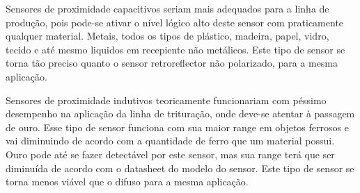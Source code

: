 \documentclass{article}
\begin{document}
Sensores de proximidade capacitivos seriam mais adequados para a linha de produção, pois pode-se ativar o nível lógico alto deste sensor com praticamente qualquer material. Metais, todos os tipos de plástico, madeira, papel, vidro, tecido e até mesmo liquidos em recepiente não metálicos. Este tipo de sensor se torna tão preciso quanto o sensor retroreflector não polarizado, para a mesma aplicação.

Sensores de proximidade indutivos teoricamente funcionariam com péssimo desempenho na aplicação da linha de trituração, onde deve-se atentar à passagem de ouro. Esse tipo de sensor funciona com sua maior range em objetos ferrosos e vai diminuindo de acordo com a quantidade de ferro que um material possui. Ouro pode até se fazer detectável por este sensor, mas sua range terá que ser diminuída de acordo com o datasheet do modelo do sensor. Este tipo de sensor se torna menos viável que o difuso para a mesma aplicação.
\end{document}
